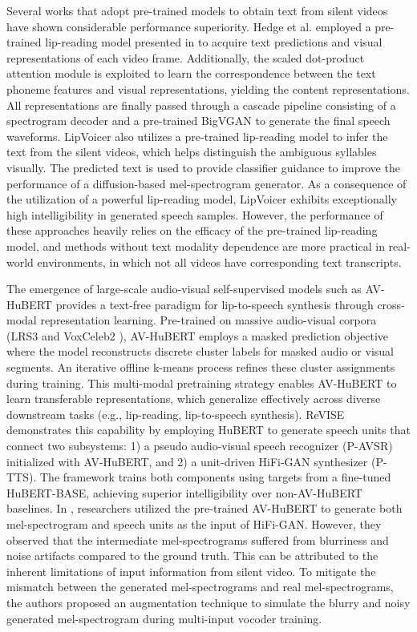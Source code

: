 Several works that adopt pre-trained models to obtain text from silent videos have shown considerable performance superiority. Hedge et al. \cite{hegde2023} employed a pre-trained lip-reading model presented in \cite{prajwal2022} to acquire text predictions and visual representations of each video frame. Additionally, the scaled dot-product attention module\cite{vaswani2017attention} is exploited to learn the correspondence between the text phoneme features and visual representations, yielding the content representations. All representations are finally passed through a cascade pipeline consisting of a spectrogram decoder and a pre-trained BigVGAN\cite{lee2023} to generate the final speech waveforms. LipVoicer\cite{yemini2023lipvoicer} also utilizes a pre-trained lip-reading model\cite{ma2023-autoavsr} to infer the text from the silent videos, which helps distinguish the ambiguous syllables visually. The predicted text is used to provide classifier guidance\cite{ho2022classifier} to improve the performance of a diffusion-based mel-spectrogram generator\cite{kong2020diffwave}. As a consequence of the utilization of a powerful lip-reading model, LipVoicer exhibits exceptionally high intelligibility in generated speech samples. However, the performance of these approaches heavily relies on the efficacy of the pre-trained lip-reading model, and methods without text modality dependence are more practical in real-world environments, in which not all videos have corresponding text transcripts. 

The emergence of large-scale audio-visual self-supervised models such as AV-HuBERT \cite{shi2022learning} provides a text-free paradigm for lip-to-speech synthesis through cross-modal representation learning. Pre-trained on massive audio-visual corpora (LRS3 and VoxCeleb2 \cite{chung2018voxceleb2}), AV-HuBERT employs a masked prediction objective where the model reconstructs discrete cluster labels for masked audio or visual segments. An iterative offline k-means process refines these cluster assignments during training. This multi-modal pretraining strategy enables AV-HuBERT to learn transferable representations, which generalize effectively across diverse downstream tasks (e.g., lip-reading, lip-to-speech synthesis). ReVISE \cite{hsu2023} demonstrates this capability by employing HuBERT \cite{hsu2021hubert} to generate speech units that connect two subsystems: 1) a pseudo audio-visual speech recognizer (P-AVSR) initialized with AV-HuBERT, and 2) a unit-driven HiFi-GAN synthesizer (P-TTS). The framework trains both components using targets from a fine-tuned HuBERT-BASE, achieving superior intelligibility over non-AV-HuBERT baselines. In \cite{choi2023-intelligible}, researchers utilized the pre-trained AV-HuBERT to generate both mel-spectrogram and speech units as the input of HiFi-GAN. However, they observed that the intermediate mel-spectrograms suffered from blurriness and noise artifacts compared to the ground truth. This can be attributed to the inherent limitations of input information from silent video. To mitigate the mismatch between the generated mel-spectrograms and real mel-spectrograms, the authors proposed an augmentation technique to simulate the blurry and noisy generated mel-spectrogram during multi-input vocoder training.

